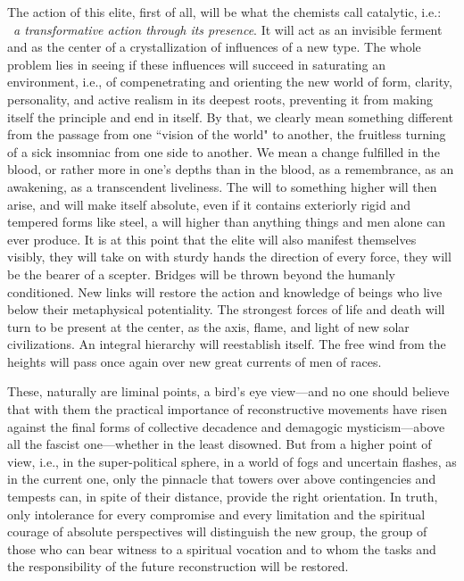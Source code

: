 The action of this elite, first of all, will be what the chemists call catalytic, i.e.:  \emph{a transformative action through its presence}. It will act as an invisible ferment and as the center of a crystallization of influences of a new type. The whole problem lies in seeing if these influences will succeed in saturating an environment, i.e., of compenetrating and orienting the new world of form, clarity, personality, and active realism in its deepest roots, preventing it from making itself the principle and end in itself. By that, we clearly mean something different from the passage from one ``vision of the world" to another, the fruitless turning of a sick insomniac from one side to another. We mean a change fulfilled in the blood, or rather more in one's depths than in the blood, as a remembrance, as an awakening, as a transcendent liveliness. The will to something higher will then arise, and will make itself absolute, even if it contains exteriorly rigid and tempered forms like steel, a will higher than anything things and men alone can ever produce. It is at this point that the elite will also manifest themselves visibly, they will take on with sturdy hands the direction of every force, they will be the bearer of a scepter. Bridges will be thrown beyond the humanly conditioned. New links will restore the action and knowledge of beings who live below their metaphysical potentiality. The strongest forces of life and death will turn to be present at the center, as the axis, flame, and light of new solar civilizations. An integral hierarchy will reestablish itself. The free wind from the heights will pass once again over new great currents of men of races.

These, naturally are liminal points, a bird's eye view—and no one should believe that with them the practical importance of reconstructive movements have risen against the final forms of collective decadence and demagogic mysticism—above all the fascist one—whether in the least disowned. But from a higher point of view, i.e., in the super-political sphere, in a world of fogs and uncertain flashes, as in the current one, only the pinnacle that towers over above contingencies and tempests can, in spite of their distance, provide the right orientation. In truth, only intolerance for every compromise and every limitation and the spiritual courage of absolute perspectives will distinguish the new group, the group of those who can bear witness to a spiritual vocation and to whom the tasks and the responsibility of the future reconstruction will be restored.


